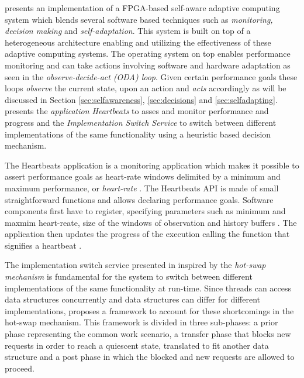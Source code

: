%
\cite{selfaware} presents an implementation of a FPGA-based self-aware adaptive computing system which blends several software based techniques such as \emph{monitoring, decision making} and \emph{self-adaptation}. This system is built on top of a heterogeneous architecture enabling and utilizing the effectiveness of these adaptive computing systems. The operating system on top enables performance monitoring and can take actions involving software and hardware adaptation as seen in the \emph{observe-decide-act (ODA) loop}. Given certain performance goals these loops \emph{observe} the current state,  upon an action and \emph{acts} accordingly as will be discussed in Section \ref{sec:selfawareness}, \ref{sec:decisions} and \ref{sec:selfadapting}. \cite{selfaware} presents the \emph{application Heartbeats} to asses and monitor performance and progress and the \emph{Implementation Switch Service} to switch between different implementations of the same functionality using a heuristic based decision mechanism. 

The Heartbeats application is a monitoring application which makes it possible to assert performance goals as heart-rate windows delimited by a minimum and maximum performance, or \emph{heart-rate} \cite{evolvable}. The Heartbeats API is made of small straightforward functions and allows declaring performance goals. Software components first have to register, specifying parameters such as minimum and maxmim heart-reate, size of the windows of observation and history buffers \cite{selfaware}. The application then updates the progress of the execution calling the function that signifies a heartbeat \cite{evolvable}.

The implementation switch service presented in \cite{selfaware} inspired by the \emph{hot-swap mechanism} is fundamental for the system to switch between different implementations of the same functionality at run-time. Since threads can access data structures concurrently and data structures can differ for different implementations, \cite{selfaware} proposes a framework to account for these shortcomings in the hot-swap mechanism.  This framework is divided in three sub-phases: a prior phase representing the common work scenario, a transfer phase that blocks new requests in order to reach a quiescent state, translated to fit another data structure and a post phase in which the blocked and new requests are allowed to proceed. 
%
%
